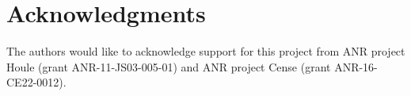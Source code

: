 \documentclass[10pt,letterpaper]{article}
\begin{document}
%
%

\section*{Acknowledgments}

The authors would like to acknowledge support for this project
from ANR project Houle (grant ANR-11-JS03-005-01) and ANR project Cense (grant ANR-16-CE22-0012).

\nolinenumbers

%
%
%
\end{document}
